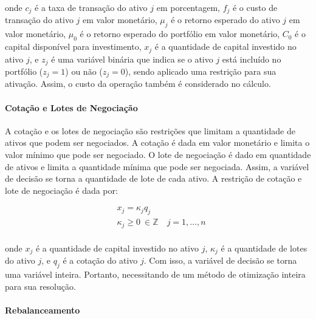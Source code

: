                     \noindent onde $c_{j}$ é a taxa de transação do ativo $j$ em porcentagem, $f_{j}$ é o custo de transação do ativo $j$ em valor monetário, $\mu_{j}$ é o retorno esperado do ativo $j$ em valor monetário, $\mu_{0}$ é o retorno esperado do portfólio em valor monetário, $C_{0}$ é o capital disponível para investimento, $x_{j}$ é a quantidade de capital investido no ativo $j$, e $z_{j}$ é uma variável binária que indica se o ativo $j$ está incluído no portfólio ($z_{j}=1$) ou não ($z_{j}=0$), sendo aplicado uma restrição para sua ativação. Assim, o custo da operação também é considerado no cálculo.

                \paragraph{Cotação e Lotes de Negociação}

                    \ipar A cotação e os lotes de negociação são restrições que limitam a quantidade de ativos que podem ser negociados. A cotação é dada em valor monetário e limita o valor mínimo que pode ser negociado. O lote de negociação é dado em quantidade de ativos e limita a quantidade mínima que pode ser negociada. Assim, a variável de decisão se torna a quantidade de lote de cada ativo. A restrição de cotação e lote de negociação é dada por:

                    \begin{equation}
                        \begin{aligned}
                            & x_{j} = \kappa_{j} q_{j} \\
                            &\kappa_{j} \geq 0 \ \in \mathbb{Z} \quad j=1, \ldots, n \\
                        \end{aligned}
                    \end{equation}

                    \noindent onde $x_{j}$ é a quantidade de capital investido no ativo $j$, $\kappa_{j}$ é a quantidade de lotes do ativo $j$, e $q_{j}$ é a cotação do ativo $j$. Com isso, a variável de decisão se torna uma variável inteira. Portanto, necessitando de um método de otimização inteira para sua resolução.
                    
                \paragraph{Rebalanceamento}


